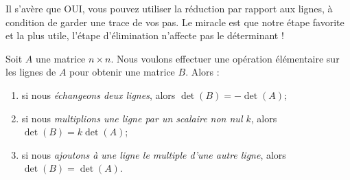 Il s'avère que OUI, vous pouvez utiliser la réduction par rapport aux lignes, à condition de
garder une trace de vos pas.  Le miracle est que notre étape favorite et
la plus utile, l'étape d'élimination n'affecte pas le déterminant !

\begin{theorem}
Soit $A$ une matrice $n\times n$. Nous voulons effectuer une opération élémentaire sur les lignes de $A$ pour obtenir une matrice $B$.  Alors :
\begin{enumerate}[(1)]
\item si nous \emph{échangeons deux lignes},
alors $\det(B) = -\det(A)$;
\item si nous \emph{multiplions une ligne par un scalaire non nul $k$},
alors $\det(B) = k\det(A)$;
\item si nous \emph{ajoutons \`a une ligne le multiple d'une autre ligne}, alors $\det(B) = \det(A)$.
\end{enumerate}
\end{theorem}

